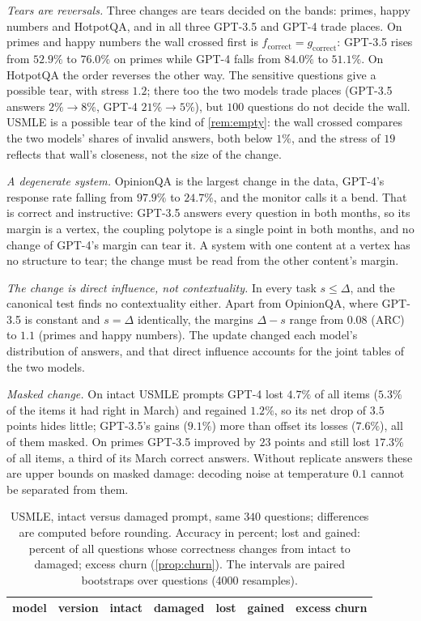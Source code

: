 \documentclass[11pt]{article}
\theoremstyle{definition}
\theoremstyle{remark}
\begin{document}
\emph{Tears are reversals.} Three changes are tears decided on the bands: primes, happy numbers and HotpotQA, and in all three GPT-3.5 and
GPT-4 trade places. On primes and happy numbers the wall crossed first is $f_{\mathrm{correct}}=g_{\mathrm{correct}}$: GPT-3.5 rises from
$52.9\%$ to $76.0\%$ on primes while GPT-4 falls from $84.0\%$ to $51.1\%$. On HotpotQA the order reverses the other way. The sensitive
questions give a possible tear, with stress $1.2$; there too the two models trade places (GPT-3.5 answers $2\%\to8\%$, GPT-4
$21\%\to5\%$), but $100$ questions do not decide the wall. USMLE is a possible tear of the kind of \cref{rem:empty}: the wall crossed
compares the two models' shares of invalid answers, both below $1\%$, and the stress of $19$ reflects that wall's closeness, not the size of
the change.

\emph{A degenerate system.} OpinionQA is the largest change in the data, GPT-4's response rate falling from $97.9\%$ to $24.7\%$, and the
monitor calls it a bend. That is correct and instructive: GPT-3.5 answers every question in both months, so its margin is a vertex, the
coupling polytope is a single point in both months, and no change of GPT-4's margin can tear it. A system with one content at a vertex has
no structure to tear; the change must be read from the other content's margin.

\emph{The change is direct influence, not contextuality.} In every task $s\le\Delta$, and the canonical test finds no contextuality either.
Apart from OpinionQA, where GPT-3.5 is constant and $s=\Delta$ identically, the margins $\Delta-s$ range from $0.08$ (ARC) to $1.1$ (primes
and happy numbers). The update changed each model's distribution of answers, and that direct influence accounts for the joint tables of
the two models.

\emph{Masked change.} On intact USMLE prompts GPT-4 lost $4.7\%$ of all items ($5.3\%$ of the items it had right in March) and regained
$1.2\%$, so its net drop of $3.5$ points hides little; GPT-3.5's gains ($9.1\%$) more than offset its losses ($7.6\%$), all of them masked.
On primes GPT-3.5 improved by $23$ points and still lost $17.3\%$ of all items, a third of its March correct answers. Without replicate
answers these are upper bounds on masked damage: decoding noise at temperature $0.1$ cannot be separated from them.

\begin{table}[ht]
\centering\footnotesize
\caption{USMLE, intact versus damaged prompt, same $340$ questions; differences are computed before rounding. Accuracy in percent; lost and gained: percent of all questions whose
correctness changes from intact to damaged; excess churn (\cref{prop:churn}). The intervals are paired bootstraps over questions
(4000 resamples).}\label{tab:usmle}
\begin{tabular}{llccccc}
\toprule
model & version & intact & damaged & lost & gained & excess churn\\
\midrule

\end{tabular}
\end{table}
\end{document}
